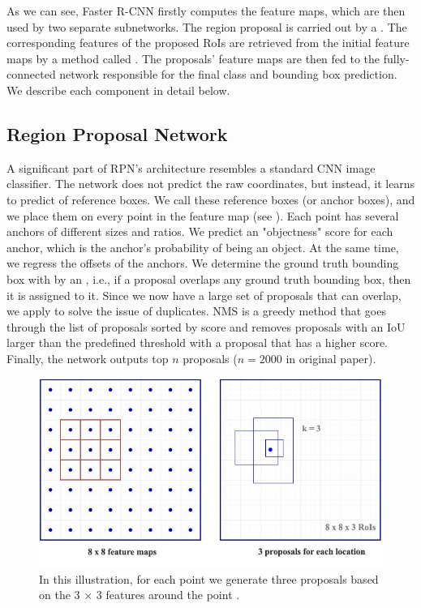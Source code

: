 As we can see, Faster R-CNN firstly computes the feature maps, which are
then used by two separate subnetworks. The region proposal is carried out
by a . The corresponding features of
the proposed RoIs are retrieved from the initial feature maps by a method
called . The proposals' feature maps are then fed to the
fully-connected network responsible for the final class and bounding box
prediction. We describe each component in detail below.

\subsection{Region Proposal Network}\label{rpn}
A significant part of RPN's architecture resembles a standard CNN image
classifier. The network does not predict the raw coordinates, but instead,
it learns to predict  of reference boxes. We call these reference
boxes  (or anchor boxes), and we place them on every point in the
feature map (see ). Each point has several anchors of
different sizes and ratios. We predict an "objectness" score for each anchor,
which is the anchor's probability of being an object. At the same time, we
regress the offsets of the anchors. We determine the ground truth bounding
box with by an , i.e., if a proposal overlaps any ground
truth bounding box, then it is assigned to it. Since we now have a large set
of proposals that can overlap, we apply 
to solve the issue of duplicates. NMS is a greedy method that goes through
the list of proposals sorted by score and removes proposals with an IoU larger
than the predefined threshold with a proposal that has a higher score. Finally,
the network outputs top $n$ proposals ($n = 2000$ in original paper).

\begin{figure}[h]
    \centering
    \includegraphics[width=0.625\linewidth]{Sources/Figures/rpn.jpeg}
    \caption{In this illustration, for each point we generate three proposals
        based on the 3 $\times$ 3 features around the point \cite{huifasterrcnn}.}
    \label{fig:rpn}
\end{figure}

